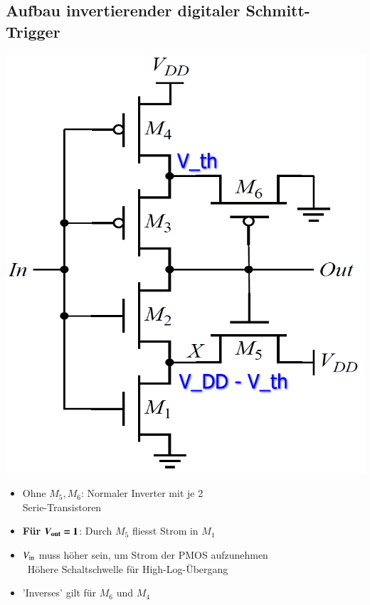 \subsection{Aufbau invertierender digitaler Schmitt-Trigger}

\begin{minipage}[position]{0.3\columnwidth}
    \includegraphics[width=\columnwidth]{images/invertierender_schmitt-trigger.png}
\end{minipage}
\hfill
\begin{minipage}[position]{0.68\columnwidth}
    \begin{itemize}
        \item Ohne $M_5, M_6$: Normaler Inverter mit je 2\\
            Serie-Transistoren
        \item \textbf{Für }$\boldsymbol{V_{\rm out} = 1}$: Durch $M_5$ fliesst Strom in $M_1$
        \item $V_{\rm in}$ muss höher sein, um Strom der PMOS aufzunehmen\\
            \textrightarrow\ Höhere Schaltschwelle für High-Log-Übergang
        \item 'Inverses' gilt für $M_6$ und $M_4$
    \end{itemize}
\end{minipage}


